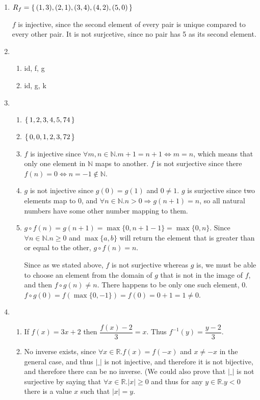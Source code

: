 \documentclass{article}
\begin{document}
\begin{enumerate}
    \item
        $R_f = \set{(1,3), (2,1), (3,4), (4,2), (5,0)}$

        $f$ is injective, since the second element of every pair is unique compared to every other pair. It is not surjcetive, since no pair has 5 as its second element.

    \item
        \begin{enumerate}
            \item id, f, g
            \item id, g, k
        \end{enumerate}

    \item
        \begin{enumerate}
            \item $\set{1,2,3,4,5,74}$
            \item $\set{0, 0, 1, 2, 3, 72}$
            \item $f$ is injective since $\forall m,n \in \mathbb{N}. m + 1 = n + 1 \Leftrightarrow m = n$, which means that only one element in $\mathbb{N}$ maps to another. $f$ is not surjective since there $f(n) = 0 \Leftrightarrow n = -1 \not\in \mathbb{N}$.
            \item $g$ is not injective since $g(0) = g(1)$ and $0 \neq 1$. $g$ is surjective since two elements map to $0$, and $\forall n \in \mathbb{N} . n > 0 \Rightarrow g(n + 1) = n$, so all natural numbers have some other number mapping to them.
            \item
                $g \circ f(n) = g(n+1) = \max\{0,n+1-1\} = \max\{0,n\}$. Since $\forall n \in \mathbb{N} . n \geq 0 $ and $\max\{a,b\}$ will return the element that is greater than or equal to the other, $g \circ f(n) = n$.

                Since as we stated above, $f$ is not surjective whereas $g$ is, we must be able to choose an element from the domain of $g$ that is not in the image of $f$, and then $f \circ g (n) \neq n$. There happens to be only one such element, 0. $f \circ g (0) = f(\max\{0,-1\}) = f(0) = 0 +1 = 1 \neq 0$.
        \end{enumerate}

    \item
        \begin{enumerate}
            \item
                If $f(x) = 3x + 2$ then $\dfrac{f(x) - 2}{3} = x$. Thus $f^{-1}(y) = \dfrac{y - 2}{3}$.
            \item No inverse exists, since $\forall x \in \mathbb{R}.f(x) = f(-x)$ and $x \neq -x$ in the general case, and thus $|\_|$ is not injective, and therefore it is not bijective, and therefore there can be no inverse. (We could also prove that $|\_|$ is not surjective by saying that $\forall x \in \mathbb{R} . |x| \geq 0$ and thus for any $y \in \mathbb{R}. y < 0$ there is a value $x$ such that $|x| = y$.


\end{enumerate}
\end{enumerate}
\end{document}
